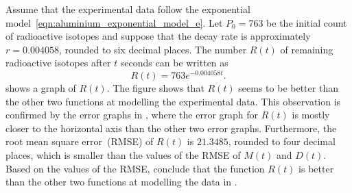 \documentclass[a4paper,oneside,12pt]{article}
\begin{document}
\begin{problem}
{\begin{solution}
Assume that the experimental data follow the exponential
model~\eqref{eqn:aluminium_exponential_model_e}.  Let $P_0 = 763$ be
the initial count of radioactive isotopes and suppose that the decay
rate is approximately $r = 0.004058$, rounded to six decimal places.
The number $R(t)$ of remaining radioactive isotopes after $t$ seconds
can be written as
\begin{equation}
\label{eqn:aluminium_mean_decay_rate}
R(t)
=
763 e^{-0.004058 t}.
\end{equation}
 shows a graph of $R(t)$.  The
figure shows that $R(t)$ seems to be better than the other two
functions at modelling the experimental data.  This observation is
confirmed by the error graphs in
, where the error graph for
$R(t)$ is mostly closer to the horizontal axis than the other two
error graphs.  Furthermore, the root mean square error~(RMSE) of
$R(t)$ is $21.3485$, rounded to four decimal places, which is smaller
than the values of the RMSE of $M(t)$ and $D(t)$.  Based on the values
of the RMSE, conclude that the function $R(t)$ is better than the
other two functions at modelling the data in
.
\end{solution}
}{}

\begin{table}[!htbp]
\centering

\caption{%
  The vapour pressure of water as temperature increases.  Temperature
  is measured in degrees Celsius~($\degreec{}$) and the vapour
  pressure of water is measured in millimetre of mercury~(mm Hg).  The
  given vapour pressures cover only the case where water is in contact
  with its own vapour.  Data are taken from the following book:
  J.~G.~Speight~(editor). \emph{Lange's Handbook of Chemistry}. 16-th
  edition, McGraw-Hill, 2005, pp.1.224--1.225.
}
\label{tab:water_vapour_pressure}
\end{table}


\end{problem}
\end{document}
